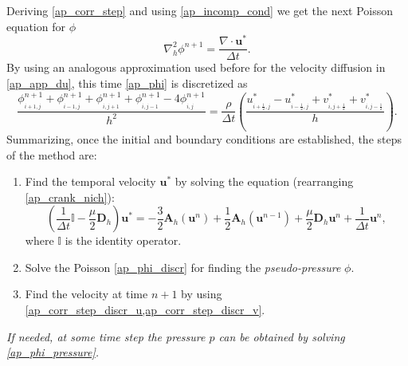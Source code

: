 Deriving \eqref{ap_corr_step} and using \eqref*{ap_incomp_cond} we get the next Poisson equation for $\phi$
\begin{equation}
\nabla^2_h\phi^{n+1}=\frac{\nabla\cdot \mathbf{u}^*}{\Delta t}.\label{eq:ap_phi}
\end{equation}
By using an analogous approximation used before for the velocity diffusion in \eqref{ap_app_du}, this time \eqref{ap_phi} is discretized as
\begin{equation}
\frac{\phi_{\!_{i+1,j}}^{n+1}+\phi^{n+1}_{\!_{i-1,j}}+\phi^{n+1}_{\!_{i,j+1}}+\phi^{n+1}_{\!_{i,j-1}}-4\phi^{n+1}_{\!_{i,j}}}{h^2}=\frac{\rho}{\Delta t}\left(\frac{u^*_{\!_{i+\frac{1}{2},j}}-u^*_{\!_{i-\frac{1}{2},j}}+v^*_{\!_{i,j+\frac{1}{2}}}+v^*_{\!_{i,j-\frac{1}{2}}}}{h}\right).\label{eq:ap_phi_discr}
\end{equation}
Summarizing, once the initial and boundary conditions are established, the steps of the method are:
\begin{enumerate}
\item Find the temporal velocity $\mathbf{u}^*$ by solving the equation (rearranging \eqref{ap_crank_nich}):
$$\left(\frac{1}{\Delta t}\mathbb{I}-\frac{\mu}{2}\mathbf{D}_h\right)\mathbf{u}^*=-\frac{3}{2}\mathbf{A}_h\left(\mathbf{u}^n\right)+\frac{1}{2}\mathbf{A}_h\left(\mathbf{u}^{n-1}\right)+\frac{\mu}{2}\mathbf{D}_h\mathbf{u}^n+\frac{1}{\Delta t}\mathbf{u}^n,$$
where $\mathbb{I}$ is the identity operator.
\item Solve the Poisson \eqref{ap_phi_discr} for finding the \emph{pseudo-pressure} $\phi$.
\item Find the velocity at time $n+1$ by using \eqref{ap_corr_step_discr_u,ap_corr_step_discr_v}.
\end{enumerate}

\begin{remark}
\it If needed, at some time step the pressure $p$ can be obtained by solving \eqref{ap_phi_pressure}.
\end{remark}